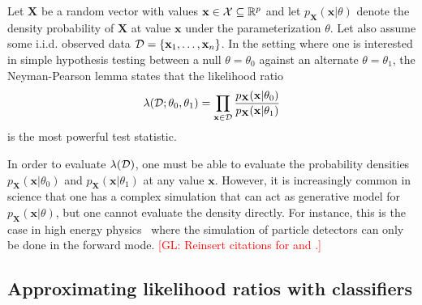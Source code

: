 \documentclass[12pt]{article}
\numberwithin{equation}{section}
\theoremstyle{plain}
\newcommand{\glnote}[1]{\textcolor{red}{[GL: #1]}}
\begin{document}
Let $\mathbf{X}$ be a random vector with values $\mathbf{x} \in {\cal X}
\subseteq \mathbb{R}^p$ and let $p_\mathbf{X}(\mathbf{x}|\theta)$ denote the
density probability of $\mathbf{X}$ at value $\mathbf{x}$ under the
parameterization $\theta$. Let also assume some i.i.d. observed data ${\cal D} = \{
\mathbf{x}_1, \dots, \mathbf{x}_n \}$. In the setting where one is interested in
simple hypothesis testing between a null $\theta=\theta_0$ against an alternate
$\theta=\theta_1$, the Neyman-Pearson lemma states that the likelihood ratio
\begin{equation}\label{eqn:likelihood-ratio-test}
\lambda({\cal D}; \theta_0, \theta_1) = \prod_{\mathbf{x} \in {\cal D}} \frac{ p_\mathbf{X}(\mathbf{x}|\theta_0)}{ p_\mathbf{X}(\mathbf{x}|\theta_1)}
\end{equation}
is the most powerful test statistic.

In order to evaluate $\lambda({\cal D})$, one must be able to evaluate the probability
densities $p_\mathbf{X}(\mathbf{x}| \theta_0)$ and $p_\mathbf{X}(\mathbf{x}| \theta_1)$ at any value $\mathbf{x}$. However,
it is increasingly common in science that one has a complex simulation that can
act as generative model for $p_\mathbf{X}(\mathbf{x}|\theta)$, but one cannot
evaluate the density directly. For instance, this is the case in high energy
physics~\citep{Neal:2007zz} where the simulation of particle detectors can only
be done in the forward mode. \glnote{Reinsert citations for \cite{ClaytonScott}
and \cite{JMLR:v14:tong13a}.}




\subsection{Approximating likelihood ratios with classifiers}
\label{sec:approx}
\end{document}
